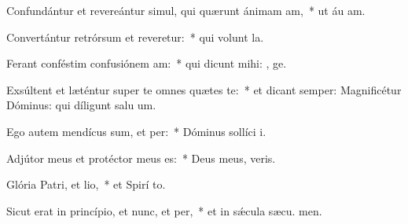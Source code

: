 \item Confundántur et revereántur simul, qui quærunt ánimam am,~* ut áu am.
\item Convertántur retrórsum et reveretur:~* qui volunt  la.
\item Ferant conféstim confusiónem am:~* qui dicunt mihi: , ge.
\item Exsúltent et læténtur super te omnes quætes te:~* et dicant semper: Magnificétur Dóminus: qui díligunt salu um.
\item Ego autem mendícus sum, et per:~* Dóminus sollíci  i.
\item Adjútor meus et protéctor meus  es:~* Deus meus,  veris.
\item Glória Patri, et lio,~* et Spirí to.
\item Sicut erat in princípio, et nunc, et per,~* et in sǽcula sæcu. men.
